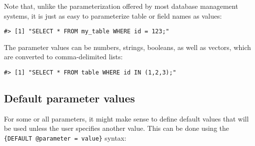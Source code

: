 \documentclass[]{article}
\newenvironment{Shaded}{\begin{snugshade}}{\end{snugshade}}
\newcommand{\DataTypeTok}[1]{\textcolor[rgb]{0.13,0.29,0.53}{#1}}
\newcommand{\DecValTok}[1]{\textcolor[rgb]{0.00,0.00,0.81}{#1}}
\newcommand{\KeywordTok}[1]{\textcolor[rgb]{0.13,0.29,0.53}{\textbf{#1}}}
\newcommand{\NormalTok}[1]{#1}
\newcommand{\OperatorTok}[1]{\textcolor[rgb]{0.81,0.36,0.00}{\textbf{#1}}}
\newcommand{\StringTok}[1]{\textcolor[rgb]{0.31,0.60,0.02}{#1}}
\begin{document}
Note that, unlike the parameterization offered by most database
management systems, it is just as easy to parameterize table or field
names as values:

\begin{Shaded}
\end{Shaded}

\begin{verbatim}
#> [1] "SELECT * FROM my_table WHERE id = 123;"
\end{verbatim}

The parameter values can be numbers, strings, booleans, as well as
vectors, which are converted to comma-delimited lists:

\begin{Shaded}
\end{Shaded}

\begin{verbatim}
#> [1] "SELECT * FROM table WHERE id IN (1,2,3);"
\end{verbatim}

\hypertarget{default-parameter-values}{%
\subsection{Default parameter values}\label{default-parameter-values}}

For some or all parameters, it might make sense to define default values
that will be used unless the user specifies another value. This can be
done using the \texttt{\{DEFAULT\ @parameter\ =\ value\}} syntax:

\begin{Shaded}
\end{Shaded}
\end{document}
